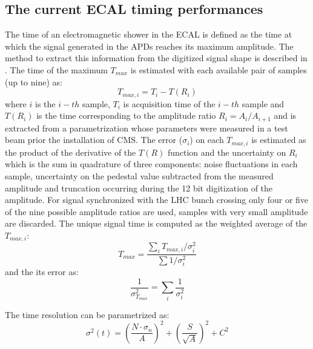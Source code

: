 
\subsection{The current ECAL timing performances}
\label{sec:ecal_time_run1}
The time of an electromagnetic shower in the ECAL is defined as the time at which the signal generated
in the APDs reaches its maximum amplitude. The method to extract this information from the digitized signal
shape is described in \cite{ecal_time_reco}. The time of the maximum $T_{max}$ is estimated with each
available pair of samples (up to nine) as:
\[
T_{max, i} = T_i - T(R_i)
\]
where $i$ is the $i-th$ sample, $T_i$ is acquisition time of the $i-th$ sample and $T(R_i)$ is the time
corresponding to the amplitude ratio $R_i = A_i/A_{i+1}$ and is extracted from a parametrization whose parameters
were measured in a test beam prior the installation of CMS. The error ($\sigma_i$) on each $T_{max, i}$ is estimated as
the product of the derivative of the $T(R)$ function and the uncertainty on $R_i$ which is the sum in quadrature
of three components: noise fluctuations in each sample, uncertainty on the pedestal value subtracted from the measured amplitude
and truncation occurring during the 12 bit digitization of the amplitude.
For signal synchronized with the LHC bunch crossing only four or five of the nine possible amplitude
ratios are used, samples with very small amplitude are discarded. The unique signal time is computed
as the weighted average of the  $T_{max, i}$:
\[
  T_{max} = \frac{\sum_i T_{max, i}/\sigma_i^2}{\sum 1/\sigma_i^2}
\]
and the its error as:
\[
  \frac{1}{\sigma_{T_{max}}^2} = \sum_i\frac{1}{\sigma_i^2}
\]

The time resolution can be parametrized as:
\begin{equation}
  \sigma^2(t) = \left( \frac{N\cdot\sigma_n}{A} \right)^2 + \left( \frac{S}{\sqrt{A}} \right)^2 + C^2  
\end{equation}
\label{eq:general_time_res}

